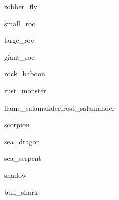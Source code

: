 \documentclass[a4paper,serif]{module}
\begin{document}
\begin{newmonster}{robber_fly}\end{newmonster}


\begin{newmonster}{small_roc}\end{newmonster}

\begin{newmonster}{large_roc}\end{newmonster}

\begin{newmonster}{giant_roc}\end{newmonster}

\begin{newmonster}{rock_baboon}\end{newmonster}

\begin{newmonster}{rust_monster}\end{newmonster}


\begin{newmonster2}{flame_salamander}{frost_salamander}\end{newmonster2}

\begin{newmonster}{scorpion}\end{newmonster}

\begin{newmonster}{sea_dragon}\end{newmonster}

\begin{newmonster}{sea_serpent}\end{newmonster}

\begin{newmonster}{shadow}\end{newmonster}


\begin{newmonster}{bull_shark}\end{newmonster}
\end{document}
